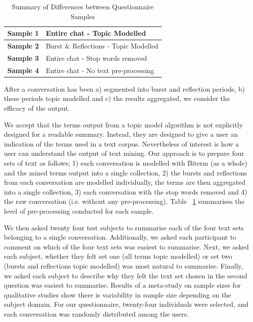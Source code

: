 \begin {table}[]
\caption {Summary of Differences between Questionnaire Samples} 
\label{tab:chapt7_study1_tab1a}
\begin{center}
\begin{tabular}{| p{2.5cm} | p{6.9cm}  |} \hline 
\textbf{Sample 1} & Entire chat - Topic Modelled  
\\ \hline  \textbf{Sample 2} & Burst \& Reflections - Topic Modelled
\\ \hline  \textbf{Sample 3} & Entire chat - Stop words removed 
\\ \hline  \textbf{Sample 4} & Entire chat - No text pre-processing 
\\ \hline
\end{tabular}
\end{center}
\end{table}

After a conversation has been a) segmented into burst and reflection periods, b) these periods topic modelled and c) the results aggregated, we consider the efficacy of the output. 

We accept that the terms output from a topic model algorithm is not explicitly designed for a readable summary. Instead, they are designed to give a user an indication of the terms used in a text corpus. Nevertheless of interest is how a user can understand the output of text mining. Our approach is to prepare four sets of text as follows; 1) each conversation is modelled with Biterm (as a whole) and the mined terms output into a single collection, 2) the bursts and reflections from each conversation are modelled individually, the terms are then aggregated into a single collection, 3) each conversation with the stop words removed and 4) the raw conversation (i.e. without any pre-processing). Table ~\ref{tab:chapt7_study1_tab1a} summarises the level of pre-processing conducted for each sample.

We then asked twenty four test subjects to summarise each of the four text sets belonging to a single conversation. Additionally, we asked each participant to comment on which of the four text sets was easiest to summarise. Next, we asked each subject, whether they felt set one (all terms topic modelled) or set two (bursts and reflections topic modelled) was most natural to summarise. Finally, we asked each subject to describe why they felt the text set chosen in the second question was easiest to summarise. Results of a meta-study on sample sizes for qualitative studies \cite{qualsample} show there is variability in sample size depending on the subject domain. For our questionnaire, twenty-four individuals were selected, and each conversation was randomly distributed among the users.

